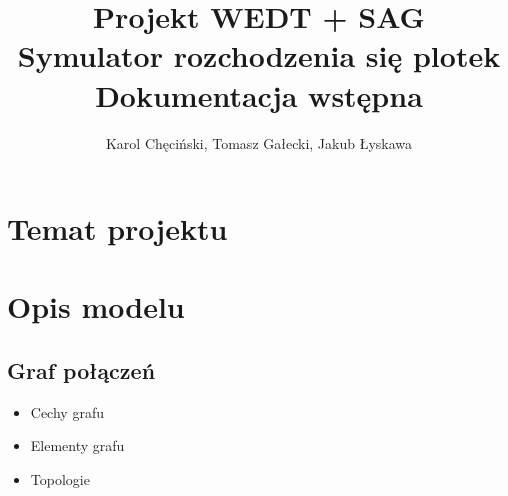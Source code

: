 \documentclass{article}
\title{Projekt WEDT + SAG \\ Symulator rozchodzenia się plotek \\ Dokumentacja wstępna}
\author{Karol Chęciński, Tomasz Gałecki, Jakub Łyskawa}
\begin{document}
	\maketitle
	\section{Temat projektu}
	\section{Opis modelu}
	\subsection{Graf połączeń}
	\begin{itemize}
		\item{Cechy grafu}
		\item{Elementy grafu}
		\item{Topologie}
	\end{itemize}
\end{document}
